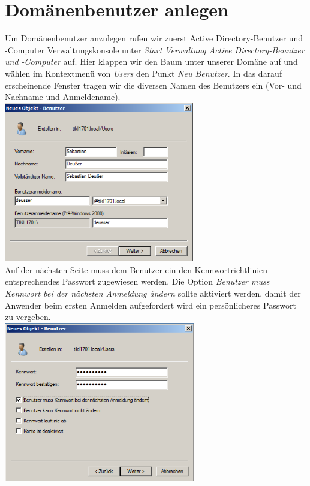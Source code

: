 \documentclass[12pt,a4paper,titlepage]{scrartcl} %
\begin{document}
\newpage
\section{Domänenbenutzer anlegen}
Um Domänenbenutzer anzulegen rufen wir zuerst Active Directory-Benutzer und -Computer Verwaltungskonsole unter \emph{Start  Verwaltung  Active Directory-Benutzer und -Computer} auf. Hier klappen wir den Baum unter unserer Domäne auf und wählen im Kontextmenü von \emph{Users} den Punkt \emph{Neu  Benutzer}. In das darauf erscheinende Fenster tragen wir die diversen Namen des Benutzers ein (Vor- und Nachname und Anmeldename).\\

	\includegraphics[height=7cm]{Bilder/050}\\
	
Auf der nächsten Seite muss dem Benutzer ein den Kennwortrichtlinien entsprechendes Passwort zugewiesen werden. Die Option \emph{Benutzer muss Kennwort bei der nächsten Anmeldung ändern} sollte aktiviert werden, damit der Anwender beim ersten Anmelden aufgefordert wird ein persönlicheres Passwort zu vergeben.\\

	\includegraphics[height=7cm]{Bilder/051}\\
	
\end{document}
